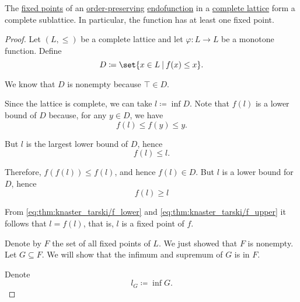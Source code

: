 \begin{theorem}\label{thm:knaster_tarski_theorem}
  The \hyperref[def:fixed_point]{fixed points} of an \hyperref[def:order_homomorphism]{order-preserving} \hyperref[def:multi_valued_function/endofunction]{endofunction} in a \hyperref[def:semilattice/lattice]{complete lattice} form a complete sublattice. In particular, the function has at least one fixed point.
\end{theorem}
\begin{proof}
   Let \( (L, \leq) \) be a complete lattice and let \( \varphi: L \to L \) be a monotone function. Define
  \begin{equation*}
    D \coloneqq \set{ x \in L \given f(x) \leq x }.
  \end{equation*}

  We know that \( D \) is nonempty because \( \top \in D \).

  Since the lattice is complete, we can take \( l \coloneqq \inf D \). Note that \( f(l) \) is a lower bound of \( D \) because, for any \( y \in D \), we have
  \begin{equation*}
    f(l) \leq f(y) \leq y.
  \end{equation*}

  But \( l \) is the largest lower bound of \( D \), hence
  \begin{equation}\label{eq:thm:knaster_tarski/f_lower}
    f(l) \leq l.
  \end{equation}

  Therefore, \( f(f(l)) \leq f(l) \), and hence \( f(l) \in D \). But \( l \) is a lower bound for \( D \), hence
  \begin{equation}\label{eq:thm:knaster_tarski/f_upper}
    f(l) \geq l
  \end{equation}

  From \eqref{eq:thm:knaster_tarski/f_lower} and \eqref{eq:thm:knaster_tarski/f_upper} it follows that \( l = f(l) \), that is, \( l \) is a fixed point of \( f \).

   Denote by \( F \) the set of all fixed points of \( L \). We just showed that \( F \) is nonempty. Let \( G \subseteq F \). We will show that the infimum and supremum of \( G \) is in \( F \).

  Denote
  \begin{equation*}
    l_G \coloneqq \inf G.
  \end{equation*}


\end{proof}
